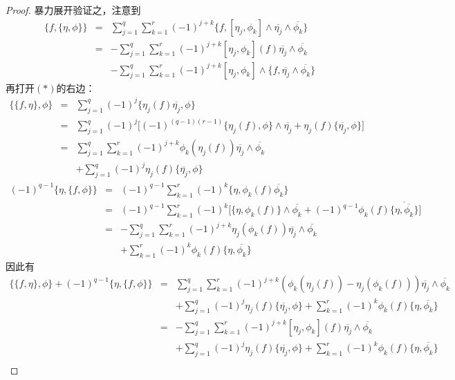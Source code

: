 \begin{proof}
暴力展开验证之，注意到
\begin{eqnarray*}
     \{f,\{\eta,\phi\}\}
&=&
     \sum_{j=1}^q
       \sum_{k=1}^r
         (-1)^{j+k}
         \{
           f
          ,
           [\eta_j,\phi_k]
           \wedge\overline{\eta_j}
           \wedge\overline{\phi_k}
         \}\\
&=&
    -\sum_{j=1}^q
       \sum_{k=1}^r
         (-1)^{j+k}
         [\eta_j,\phi_k](f)
               \overline{\eta_j}
         \wedge\overline{\phi_k}\\
& &
    -\sum_{j=1}^q
       \sum_{k=1}^r
         (-1)^{j+k}
         [\eta_j,\phi_k]\wedge
         \{
           f
         ,
           \overline{\eta_j}\wedge\overline{\phi_k}
         \}
\end{eqnarray*}
再打开$(*)$的右边：
\begin{eqnarray*}
     \{\{f,\eta\},\phi\}
&=&
     \sum_{j=1}^q(-1)^j
       \{\eta_j(f)\overline{\eta_j},\phi\}\\
&=&
     \sum_{j=1}^q(-1)^j
       \Big[
         (-1)^{(q-1)(r-1)}
         \{\eta_j(f),\phi\}\wedge
         \overline{\eta_j}
        +\eta_j(f)\{\overline{\eta_j},\phi\}
       \Big]\\
&=&
     \sum_{j=1}^q
       \sum_{k=1}^r
         (-1)^{j+k}
         \phi_k(\eta_j(f))
         \overline{\eta_j}\wedge\overline{\phi_k}\\
& &
    +\sum_{j=1}^q(-1)^j
       \eta_j(f)\{\overline{\eta_j},\phi\}
\end{eqnarray*}
\begin{eqnarray*}
     (-1)^{q-1}\{\eta,\{f,\phi\}\}
&=&
     (-1)^{q-1}
     \sum_{k=1}^r(-1)^k
       \{\eta,\phi_k(f)\overline{\phi_k}\}\\
&=&
     (-1)^{q-1}
     \sum_{k=1}^r(-1)^k
       \Big[
         \{\eta,\phi_k(f)\}\wedge
         \overline{\phi_k}
        +(-1)^{q-1}
         \phi_k(f)\{\overline{\eta,\overline{\phi_k}}\}
       \Big]\\
&=&
    -\sum_{j=1}^q
       \sum_{k=1}^r
         (-1)^{j+k}
         \eta_j(\phi_k(f))
         \overline{\eta_j}\wedge\overline{\phi_k}\\
& &
    +\sum_{k=1}^r(-1)^k
       \phi_k(f)\{\eta,\overline{\phi_k}\}
\end{eqnarray*}
因此有
\begin{eqnarray*}
     \{\{f,\eta\},\phi\}+(-1)^{q-1}\{\eta,\{f,\phi\}\}
&=&
     \sum_{j=1}^q
       \sum_{k=1}^r
         (-1)^{j+k}
         (\phi_k(\eta_j(f))-\eta_j(\phi_k(f)))
         \overline{\eta_j}\wedge\overline{\phi_k}\\
& &
    +\sum_{j=1}^q(-1)^j
       \eta_j(f)\{\overline{\eta_j},\phi\}
    +\sum_{k=1}^r(-1)^k
       \phi_k(f)\{\eta,\overline{\phi_k}\}\\
&=&
    -\sum_{j=1}^q
       \sum_{k=1}^r
         (-1)^{j+k}
         [\eta_j,\phi_k](f)
               \overline{\eta_j}
         \wedge\overline{\phi_k}\\
& &
    +\sum_{j=1}^q(-1)^j
       \eta_j(f)\{\overline{\eta_j},\phi\}
    +\sum_{k=1}^r(-1)^k
       \phi_k(f)\{\eta,\overline{\phi_k}\}\\
\end{eqnarray*}


\end{proof}
